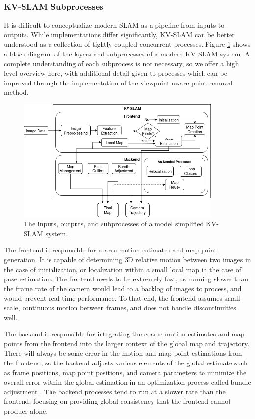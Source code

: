 \subsubsection{KV-SLAM Subprocesses}

It is difficult to conceptualize modern SLAM as a pipeline from inputs to outputs. While implementations differ significantly, KV-SLAM can be better understood as a collection of tightly coupled concurrent processes. Figure \ref{fig:subprocesses} shows a block diagram of the layers and subprocesses of a modern KV-SLAM system. A complete understanding of each subprocess is not necessary, so we offer a high level overview here, with additional detail given to processes which can be improved through the implementation of the viewpoint-aware point removal method.

\begin{figure}[!ht]
    \centering
    \includegraphics[width=0.9\textwidth]{resources/subprocesses.png}
    \caption[KV-SLAM Subprocesses]{The inputs, outputs, and subprocesses of a model simplified KV-SLAM system.}
    \label{fig:subprocesses}
\end{figure}

The frontend is responsible for coarse motion estimates and map point generation. It is capable of determining 3D relative motion between two images in the case of initialization, or localization within a small local map in the case of pose estimation. The frontend needs to be extremely fast, as running slower than the frame rate of the camera would lead to a backlog of images to process, and would prevent real-time performance. To that end, the frontend assumes small-scale, continuous motion between frames, and does not handle discontinuities well.

The backend is responsible for integrating the coarse motion estimates and map points from the frontend into the larger context of the global map and trajectory. There will always be some error in the motion and map point estimations from the frontend, so the backend adjusts various elements of the global estimate such as frame positions, map point positions, and camera parameters to minimize the overall error within the global estimation in an optimization process called bundle adjustment \cite{triggsBundleAdjustmentModern2000a}. The backend processes tend to run at a slower rate than the frontend, focusing on providing global consistency that the frontend cannot produce alone.


